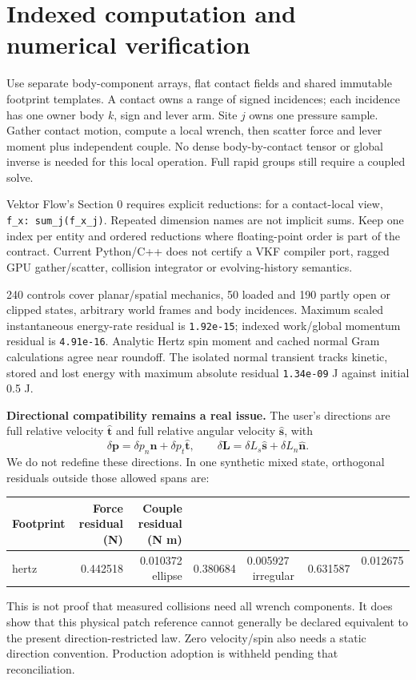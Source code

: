 \documentclass[10pt,a4paper]{article}
\begin{document}
\newpage
\section*{Indexed computation and numerical verification}
Use separate body-component arrays, flat contact fields and shared immutable
footprint templates. A contact owns a range of signed incidences; each incidence
has one owner body $k$, sign and lever arm. Site $j$ owns one pressure sample.
Gather contact motion, compute a local wrench, then scatter force and lever moment
plus independent couple. No dense body-by-contact tensor or global inverse is
needed for this local operation. Full rapid groups still require a coupled solve.

Vektor Flow's Section 0 requires explicit reductions: for a contact-local view,
\texttt{f\_x: sum\_j(f\_x\_j)}. Repeated dimension names are not implicit sums.
Keep one index per entity and ordered reductions where floating-point order is
part of the contract. Current Python/C++ does not certify a VKF compiler port,
ragged GPU gather/scatter, collision integrator or evolving-history semantics.

240 controls cover planar/spatial mechanics, 50 loaded and 190 partly open or
clipped states, arbitrary world frames and body incidences. Maximum scaled
instantaneous energy-rate residual is \texttt{1.92e-15}; indexed work/global
momentum residual is \texttt{4.91e-16}. Analytic Hertz spin moment and cached
normal Gram calculations agree near roundoff. The isolated normal transient
tracks kinetic, stored and lost energy with maximum absolute residual
\texttt{1.34e-09} J against initial 0.5 J.

\textbf{Directional compatibility remains a real issue.}
The user's directions are full relative velocity $\hat{\mathbf t}$ and full
relative angular velocity $\hat{\mathbf s}$, with
\[
 \delta\mathbf p=\delta p_n\hat{\mathbf n}+\delta p_t\hat{\mathbf t},\qquad
 \delta\mathbf L=\delta L_s\hat{\mathbf s}+\delta L_n\hat{\mathbf n}.
\]
We do not redefine these directions. In one synthetic mixed state, orthogonal
residuals outside those allowed spans are:
\begin{center}\begin{tabular}{lrr}\toprule
Footprint & Force residual (N) & Couple residual (N m)\\\midrule
hertz & 0.442518 & 0.010372 \
ellipse & 0.380684 & 0.005927 \
irregular & 0.631587 & 0.012675 \
\bottomrule\end{tabular}\end{center}
This is not proof that measured collisions need all wrench components. It does
show that this physical patch reference cannot generally be declared equivalent
to the present direction-restricted law. Zero velocity/spin also needs a static
direction convention. Production adoption is withheld pending that reconciliation.
\end{document}
